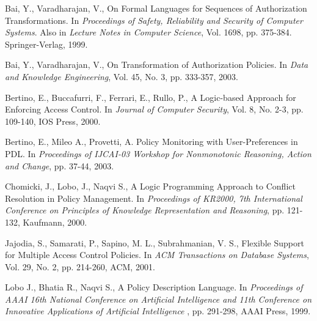\documentclass[11pt, twocolumn]{article}
\begin{document}
  \begin{thebibliography}{5}
      Bai, Y., Varadharajan, V.,
      On Formal Languages for Sequences of Authorization Transformations.
      In {\em Proceedings of Safety, Reliability and Security of Computer
      Systems}. Also in {\em Lecture Notes in Computer Science},
      Vol. 1698, pp. 375-384. Springer-Verlag, 1999.

      Bai, Y., Varadharajan, V.,
      On Transformation of Authorization Policies.
      In {\em Data and Knowledge Engineering},
      Vol. 45, No. 3, pp. 333-357, 2003.

      Bertino, E., Buccafurri, F., Ferrari, E., Rullo, P.,
      A Logic-based Approach for Enforcing Access Control.
      In {\em Journal of Computer Security},
      Vol. 8, No. 2-3, pp. 109-140, IOS Press, 2000.

      Bertino, E., Mileo A., Provetti, A.
      Policy Monitoring with User-Preferences in PDL.
      In {\em Proceedings of IJCAI-03 Workshop for Nonmonotonic Reasoning,
      Action and Change},
      pp. 37-44, 2003.

      Chomicki, J., Lobo, J., Naqvi S.,
      A Logic Programming Approach to Conflict Resolution in Policy Management.
      In {\em Proceedings of KR2000, 7th International Conference on Principles
      of Knowledge Representation and Reasoning},
      pp. 121-132, Kaufmann, 2000.

      Jajodia, S., Samarati, P., Sapino, M. L., Subrahmanian, V. S.,
      Flexible Support for Multiple Access Control Policies.
      In {\em ACM Transactions on Database Systems},
      Vol. 29, No. 2, pp. 214-260, ACM, 2001.

      Lobo J., Bhatia R., Naqvi S.,
      A Policy Description Language.
      In {\em Proceedings of AAAI 16th National Conference on Artificial
      Intelligence and 11th Conference on Innovative Applications of Artificial
      Intelligence },
      pp. 291-298, AAAI Press, 1999.
  \end{thebibliography}
\end{document}
